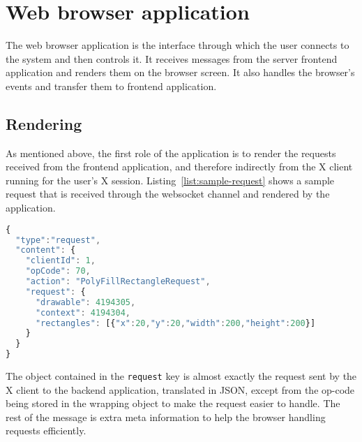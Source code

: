 \chapter{Web browser application}
%
The web browser application is the interface through which the user connects to the system 
and then controls it. It receives messages from the server frontend application and renders them 
on the browser screen. It also handles the browser's events and transfer them to frontend
application.
%
\section{Rendering}
%
As mentioned above, the first role of the application is to render the requests received from 
the frontend application, and therefore indirectly from the X client running for the user's 
X session. Listing~\ref{list:sample-request} shows a sample request that is received 
through the websocket channel and rendered by the application.
\begin{lstlisting}[basicstyle=\footnotesize,caption=Sample request,language=javascript,label=list:sample-request]
{
  "type":"request",
  "content": {
    "clientId": 1,
    "opCode": 70,
    "action": "PolyFillRectangleRequest",
    "request": {
      "drawable": 4194305,
      "context": 4194304,
      "rectangles": [{"x":20,"y":20,"width":200,"height":200}]
    }
  }
}
\end{lstlisting}
The object contained in the \lstinline{request} key is almost exactly the request 
sent by the X client to the backend application, translated in JSON, except from the 
op-code being stored in the wrapping object to make the request easier to handle.
The rest of the message is extra meta information to help the browser handling 
requests efficiently. 